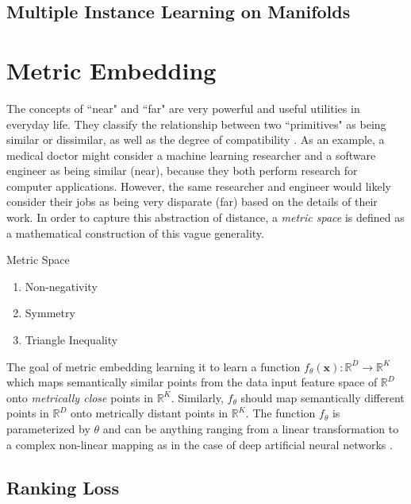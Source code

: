 \subsection{Multiple Instance Learning on Manifolds}

\section{Metric Embedding}

The concepts of ``near" and ``far" are very powerful and useful utilities in everyday life.  They classify the relationship between two ``primitives" as being similar or dissimilar, as well as the degree of compatibility \cite{Thorstensen2009ManifoldThesis}. As an example, a medical doctor might consider a machine learning researcher and a software engineer as being similar (near), because they both perform research for computer applications.  However, the same researcher and engineer would likely consider their jobs as being very disparate (far) based on the details of their work.  In order to capture this abstraction of distance, a \textit{metric space} is defined as a mathematical construction  of this vague generality.

 \theoremstyle{definition}
 \begin{definition}{Metric Space}

 \end{definition}
 	\begin{enumerate}
	\item Non-negativity
	\item Symmetry
	\item  Triangle Inequality
	\end{enumerate}

The goal of metric embedding learning it to learn a function $f_{\theta}(\bm{x}):\mathbb{R}^{D} \rightarrow \mathbb{R}^{K}$ which maps semantically similar points from the data input feature space of $\mathbb{R}^{D}$ onto \textit{metrically close} points in $\mathbb{R}^{K}$.  Similarly, $f_{\theta}$ should map semantically different points in $\mathbb{R}^{D}$ onto metrically distant points in $\mathbb{R}^{K}$.  The function $f_{\theta}$ is parameterized by $\theta$ and can be anything ranging from a linear transformation to a complex non-linear mapping as in the case of deep artificial neural networks \cite{Hermans2017DefenseTripletLoss}.


	\subsection{Ranking Loss}
	
